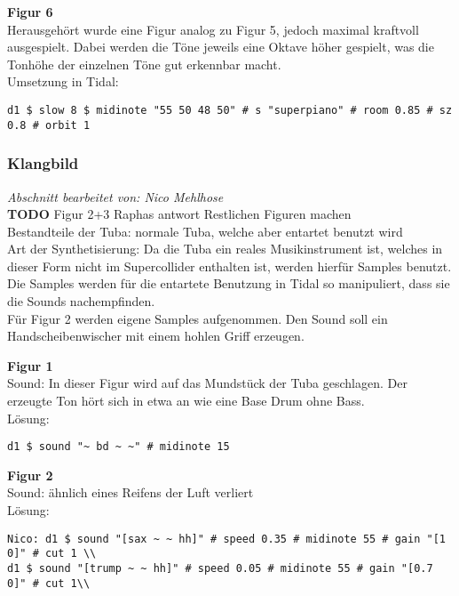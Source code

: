 \documentclass[
10pt, %
a4paper, %
oneside, %
headinclude,footinclude, %
BCOR5mm, %
]{scrartcl}
\begin{document}
\noindent\textbf{Figur 6}\\
Herausgehört wurde eine Figur analog zu Figur 5, jedoch maximal kraftvoll ausgespielt. Dabei werden die Töne jeweils eine Oktave höher gespielt, was die Tonhöhe der einzelnen Töne gut erkennbar macht.\\

\noindent Umsetzung in Tidal:
\begin{lstlisting}
d1 $ slow 8 $ midinote "55 50 48 50" # s "superpiano" # room 0.85 # sz 0.8 # orbit 1
\end{lstlisting}

\subsubsection{Klangbild}
\textit{Abschnitt bearbeitet von: Nico Mehlhose}\\
{\color{red}\textbf{TODO}} Figur 2+3 Raphas antwort Restlichen Figuren machen\\
\noindent Bestandteile der Tuba: normale Tuba, welche aber entartet benutzt wird\\
Art der Synthetisierung: Da die Tuba ein reales Musikinstrument ist, welches in dieser Form nicht im Supercollider enthalten ist,
werden hierfür Samples benutzt. Die Samples werden für die entartete Benutzung in Tidal so manipuliert, dass sie die Sounds
nachempfinden.\\
Für Figur 2 werden eigene Samples aufgenommen. Den Sound soll ein Handscheibenwischer mit einem hohlen Griff erzeugen.

\noindent\textbf{Figur 1}\\
 Sound: In dieser Figur wird auf das Mundstück der Tuba geschlagen. Der erzeugte Ton hört sich in etwa an wie eine Base Drum ohne Bass.\\
Lösung:\\
\begin{lstlisting}
d1 $ sound "~ bd ~ ~" # midinote 15
\end{lstlisting}

\noindent\textbf{Figur 2}\\
Sound: ähnlich eines Reifens der Luft verliert\\
Lösung:\\
\begin{lstlisting}
Nico: d1 $ sound "[sax ~ ~ hh]" # speed 0.35 # midinote 55 # gain "[1 0]" # cut 1 \\
d1 $ sound "[trump ~ ~ hh]" # speed 0.05 # midinote 55 # gain "[0.7 0]" # cut 1\\
\end{lstlisting}
\end{document}
